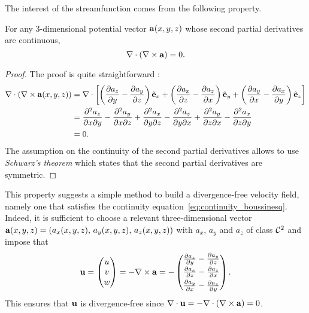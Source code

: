 The interest of the streamfunction comes from the following property.
\begin{propertyapp} \label{prop:streamfunction}
	For any 3-dimensional potential vector $\mathbf a(x,y,z)$ whose second partial derivatives are continuous,
	\begin{equation}
		\nabla \cdot (\nabla \times \mathbf a) = 0.
	\end{equation}
\end{propertyapp}
\begin{proof}
	The proof is quite straightforward :
	\begin{align*}
		\nabla \cdot (\nabla \times \mathbf a(x,y,z)) &= \nabla \cdot \left[\left(\frac{\partial a_z}{\partial y}-\frac{\partial a_y}{\partial z}\right)\hat{\mathbf{e}}_x + \left(\frac{\partial a_x}{\partial z}-\frac{\partial a_z}{\partial x}\right)\hat{\mathbf{e}}_y + \left(\frac{\partial a_y}{\partial x}-\frac{\partial a_x}{\partial y}\right)\hat{\mathbf{e}}_z \right]\\
		&= \frac{\partial^2 a_z}{\partial x \partial y} - \frac{\partial^2 a_y}{\partial x \partial z} + \frac{\partial^2 a_x}{\partial y \partial z} - \frac{\partial^2 a_z}{\partial y \partial x} + \frac{\partial^2 a_y}{\partial z \partial x} - \frac{\partial^2 a_x}{\partial z \partial y}\\
		&= 0.  
	\end{align*}
	The assumption on the continuity of the second partial derivatives allows to use \textit{Schwarz's theorem} which states that the second partial derivatives are symmetric.
\end{proof}
This property suggests a simple method to build a divergence-free velocity field, namely one that satisfies the continuity equation~\eqref{eq:continuity_boussinesq}. Indeed, it is sufficient to choose a relevant three-dimensional vector $\mathbf a(x,y,z) = (a_x(x,y,z),\,a_y(x,y,z),\,a_z(x,y,z))$ with $a_x$, $a_y$ and $a_z$ of class $\mathcal{C}^2$ and impose that 
\begin{equation} \label{eq:stream3d}
	\mathbf u = \begin{pmatrix} u \\ v \\ w \end{pmatrix} = - \nabla \times \mathbf a = - \begin{pmatrix} \frac{\partial a_z}{\partial y}-\frac{\partial a_y}{\partial z}\\[.1 cm]
													\frac{\partial a_x}{\partial z}-\frac{\partial a_z}{\partial x}\\[.1 cm]
													\frac{\partial a_y}{\partial x}-\frac{\partial a_x}{\partial y}
									\end{pmatrix}.
\end{equation}
This ensures that $\mathbf u$ is divergence-free since $\nabla \cdot \mathbf u = - \nabla \cdot \left( \nabla \times \mathbf a \right) = 0$.

